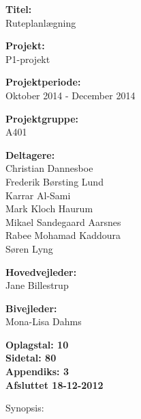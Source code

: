 \begin{minipage}[t]{0.48\textwidth}
\textbf{Titel:} \\[5pt]\bigskip\hspace{2ex}
Ruteplanlægning

\textbf{Projekt:} \\[5pt]\bigskip\hspace{2ex}
P1-projekt

\textbf{Projektperiode:} \\[5pt]\bigskip\hspace{2ex}
Oktober 2014 - December 2014

\textbf{Projektgruppe:} \\[5pt]\bigskip\hspace{2ex}
A401	

\textbf{Deltagere:} \\[5pt]\hspace*{2ex}
Christian Dannesboe \\\hspace*{2ex}
Frederik Børsting Lund \\\hspace*{2ex}
Karrar Al-Sami \\\hspace*{2ex}
Mark Kloch Haurum \\\hspace*{2ex}
Mikael Sandegaard Aarsnes \\\hspace*{2ex}
Rabee Mohamad Kaddoura \\\bigskip\hspace{2ex}
Søren Lyng

\textbf{Hovedvejleder:} \\[5pt]\hspace*{2ex}
Jane Billestrup \\\bigskip\hspace{2ex}

\textbf{Bivejleder:} \\[5pt]\hspace*{2ex}
Mona-Lisa Dahms \\\bigskip\hspace{2ex}
\vspace*{1cm}

\textbf{Oplagstal: 10} \\
\textbf{Sidetal: 80} \\
\textbf{Appendiks: 3} \\ 
\textbf{Afsluttet 18-12-2012}

\end{minipage}
\hfill
\begin{minipage}[t]{0.483\textwidth}
Synopsis: \\[5pt]
\fbox{\parbox{7cm}{\bigskip\bigskip}}
\end{minipage}

